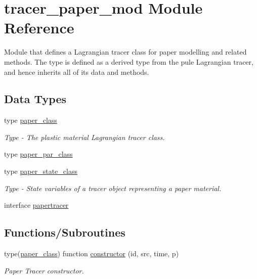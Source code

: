 \hypertarget{namespacetracer__paper__mod}{}\section{tracer\+\_\+paper\+\_\+mod Module Reference}
\label{namespacetracer__paper__mod}


Module that defines a Lagrangian tracer class for paper modelling and related methods. The type is defined as a derived type from the pule Lagrangian tracer, and hence inherits all of it\textquotesingle{}s data and methods.  


\subsection*{Data Types}
\begin{DoxyCompactItemize}
\item 
type \mbox{\hyperlink{structtracer__paper__mod_1_1paper__class}{paper\+\_\+class}}
\begin{DoxyCompactList}\small\item\em Type -\/ The plastic material Lagrangian tracer class. \end{DoxyCompactList}\item 
type \mbox{\hyperlink{structtracer__paper__mod_1_1paper__par__class}{paper\+\_\+par\+\_\+class}}
\item 
type \mbox{\hyperlink{structtracer__paper__mod_1_1paper__state__class}{paper\+\_\+state\+\_\+class}}
\begin{DoxyCompactList}\small\item\em Type -\/ State variables of a tracer object representing a paper material. \end{DoxyCompactList}\item 
interface \mbox{\hyperlink{interfacetracer__paper__mod_1_1papertracer}{papertracer}}
\end{DoxyCompactItemize}
\subsection*{Functions/\+Subroutines}
\begin{DoxyCompactItemize}
\item 
type(\mbox{\hyperlink{structtracer__paper__mod_1_1paper__class}{paper\+\_\+class}}) function \mbox{\hyperlink{namespacetracer__paper__mod_ab53f84300a313c395a5c3535f17022bb}{constructor}} (id, src, time, p)
\begin{DoxyCompactList}\small\item\em Paper Tracer constructor. \end{DoxyCompactList}\end{DoxyCompactItemize}



